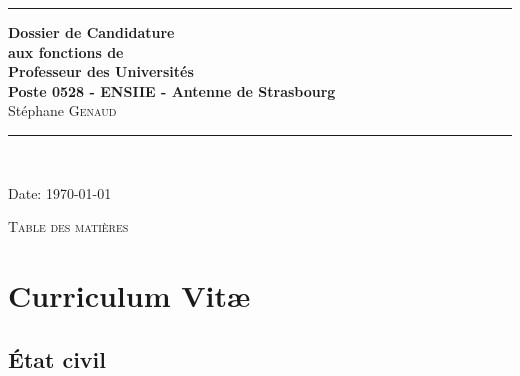 \documentclass[11pt]{article}
\begin{document}
\thispagestyle{empty}




\rule{\linewidth}{1mm}
\begin{center}
\Large{\textbf{Dossier de Candidature\\
aux fonctions de \\
Professeur des Universités\\
Poste 0528 - ENSIIE - Antenne de Strasbourg}}\\[5mm]
\Large{Stéphane \textsc{Genaud}}\\[1cm]

\rule{\linewidth}{1mm}
\\
\vspace{3cm}
\end{center}
\begin{center}
Date: \today\\
\end{center}

\newpage
\mbox{}%

\setlength{\parindent}{5mm} %
\setlength{\parindent}{0mm}
\newpage


\begin{center}
\huge{\textsc{Table des matières}}
\end{center}
\vspace{2cm}


\tableofcontents

\noindent


\newpage

\newcommand{\mysf}{\sectionfont}
\sectionfont{\sectionrule{3ex}{0pt}{-1ex}{2pt}}
\subsectionfont{\sectionrule{1ex}{0pt}{-1ex}{1pt}}


\section{Curriculum Vit{\ae}}

\setlength{\tabcolsep}{5pt}

\subsection{\'Etat civil}
\end{document}
